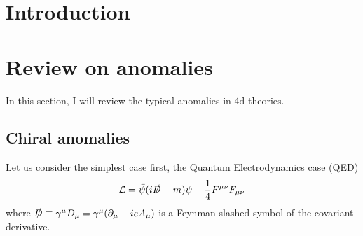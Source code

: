 \documentclass[a4paper,pdftex,10pt]{article}
\begin{document}
\maketitle

\tableofcontents

\clearpage
\section{Introduction}





\clearpage
\section{Review on anomalies}


In this section, I will review the typical anomalies in 4d theories.


\subsection{Chiral anomalies}

Let us consider the simplest case first, the Quantum Electrodynamics case (QED)
\begin{equation}
  \mathcal{L}
  =
  \bar{\psi}(i\slashed{D}-m)\psi
  -
  \frac{1}{4}F^{\mu\nu}F_{\mu\nu}
\end{equation}
where $\slashed{D}\equiv\gamma^{\mu}D_{\mu}=\gamma^{\mu}(\partial_{\mu}-ieA_{\mu})$ is a Feynman slashed symbol of the covariant derivative. 

























\clearpage



\nocite{Arkani-Hamed:2001uol}

\end{document}

